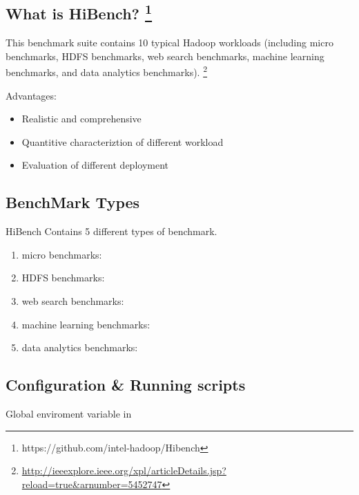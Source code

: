 \documentclass[letterpaper,10pt,english]{sphinxmanual}
\begin{document}
\subsection{What is HiBench? \footnote{
https://github.com/intel-hadoop/Hibench
}}
\label{docs/hibench_intro/index:what-is-hibench}
This benchmark suite contains 10 typical Hadoop workloads (including micro benchmarks, HDFS benchmarks, web search benchmarks, machine learning benchmarks, and data analytics benchmarks). \footnote{
\href{http://ieeexplore.ieee.org/xpl/articleDetails.jsp?reload=true\&arnumber=5452747}{http://ieeexplore.ieee.org/xpl/articleDetails.jsp?reload=true\&arnumber=5452747}
}

Advantages:
\begin{itemize}
\item {} 
Realistic and comprehensive

\item {} 
Quantitive characteriztion of different workload

\item {} 
Evaluation of different deployment

\end{itemize}


\subsection{BenchMark Types}
\label{docs/hibench_intro/index:benchmark-types}
HiBench Contains 5 different types of benchmark.
\begin{enumerate}
\item {} 
micro benchmarks:   

\item {} 
HDFS benchmarks:  

\item {} 
web search benchmarks:  

\item {} 
machine learning benchmarks:   

\item {} 
data analytics benchmarks:   

\end{enumerate}


\subsection{Configuration \& Running scripts}
\label{docs/hibench_intro/index:configuration-running-scripts}
Global enviroment variable in 
\end{document}
